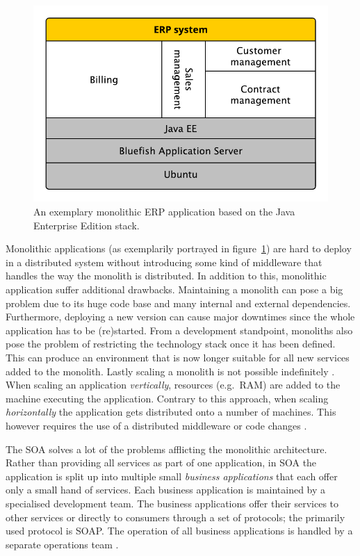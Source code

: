 \begin{figure}[H]
\begin{center}
  \includegraphics[scale=0.7]{images/figures/monolith_example.pdf}
\end{center}
\caption{An exemplary monolithic \ac{ERP} application based on the Java
Enterprise Edition stack.}%
\label{fig:monolith_example}
\end{figure}

Monolithic applications (as exemplarily portrayed in
figure~\ref{fig:monolith_example}) are hard to deploy in a distributed system
without introducing some kind of middleware that handles the way the monolith
is distributed. In addition to this, monolithic application suffer additional
drawbacks. Maintaining a monolith can pose a big problem due to its huge code
base and many internal and external dependencies. Furthermore, deploying a new
version can cause major downtimes since the whole application has to be
(re)started. From a development standpoint, monoliths also pose the problem of
restricting the technology stack once it has been defined. This can produce an
environment that is now longer suitable for all new services added to the
monolith. Lastly scaling a monolith is not possible indefinitely \autocite[p.
2]{DragoniMicroservicesyesterdaytoday2016}. When scaling an application
\textit{vertically}, resources (e.g.\ RAM) are added to the machine executing
the application. Contrary to this approach, when scaling \textit{horizontally}
the application gets distributed onto a number of machines. This however
requires the use of a distributed middleware or code changes \autocite[Ch.
1.1.1]{LuksaKubernetesAction2017}.

The \ac{SOA} solves a lot of the problems afflicting the monolithic
architecture. Rather than providing all services as part of one application, in
\ac{SOA} the application is split up into multiple small \textit{business
applications} that each offer only a small hand of services. Each business
application is maintained by a specialised development team. The business
applications offer their services to other services or directly to consumers
through a set of protocols; the primarily used protocol is \ac{SOAP}. The
operation of all business applications is handled by a separate operations
team \autocite[p. 584]{VillamizarEvaluatingmonolithicmicroservice2015}.

